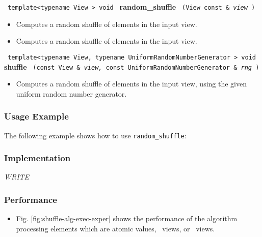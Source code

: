 \noindent
\texttt{%
template<typename View >
\newline
void 
}
\newline
\textbf{random\_shuffle}%
\texttt{%
(View const \&
\textit{view}%
)
}

\begin{itemize}
\item
Computes a random shuffle of elements in the input view. 
\item
Computes a random shuffle of elements in the input view. 
\end{itemize}
 
\noindent
\texttt{%
template<typename View, typename UniformRandomNumberGenerator >
\newline
void 
}
\newline
\textbf{shuffle}%
\texttt{%
(const View \&
\textit{view,}%
const UniformRandomNumberGenerator \&
\textit{rng}%
)
}

\begin{itemize}
\item
Computes a random shuffle of elements in the input view, using the given uniform random number generator. 
\end{itemize}

\subsubsection{Usage Example} %

The following example shows how to use \texttt{random\_shuffle}:

 
\subsubsection{Implementation} %

\textit{WRITE}

\subsubsection{Performance} %

\begin{itemize}
\item
Fig. \ref{fig:shuffle-alg-exec-exper}
shows the performance of the algorithm processing
elements which are atomic values, \stl\ views, or \stapl\ views.
\end{itemize}

